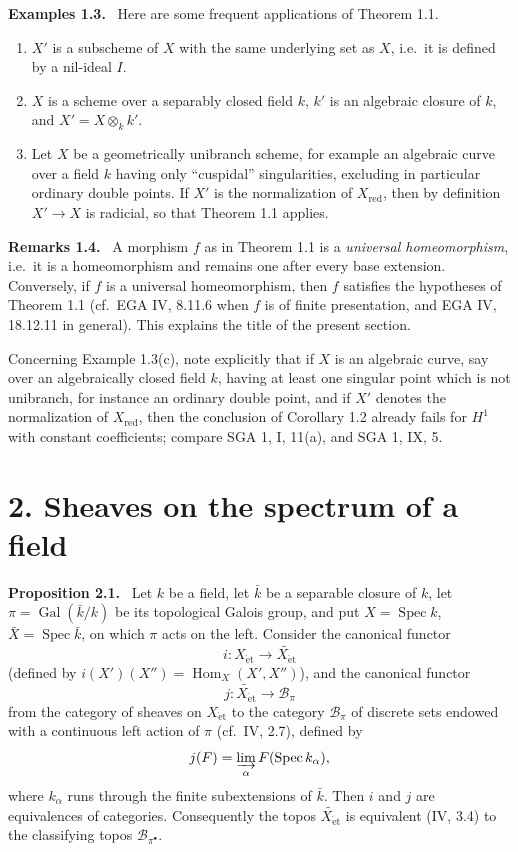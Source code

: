 \documentclass[11pt]{article}
\newcommand{\Bb}{\mathcal{B}}
\newcommand{\Spec}{\operatorname{Spec}}
\newcommand{\Hom}{\operatorname{Hom}}
\newcommand{\Gal}{\operatorname{Gal}}
\newcommand{\red}{\mathrm{red}}
\newcommand{\et}{\mathrm{\acute{e}t}}
\newcommand{\ie}{i.e.\ }
\newcommand{\cf}{cf.\ }
\newcommand{\SGA}{SGA}
\newcommand{\EGA}{EGA}
\newenvironment{statement}[1]{\par\medskip\noindent\textbf{#1.}\ }{\par\medskip}
\newenvironment{remarktext}[1]{\par\medskip\noindent\textbf{#1.}\ }{\par\medskip}
\begin{document}
\begin{remarktext}{Examples 1.3}
Here are some frequent applications of Theorem 1.1.
\begin{enumerate}[label=\alph*)]
\item \(X'\) is a subscheme of \(X\) with the same underlying set as \(X\), \ie it is defined by a nil-ideal \(I\).
\item \(X\) is a scheme over a separably closed field \(k\), \(k'\) is an algebraic closure of \(k\), and \(X'=X\otimes_k k'\).
\item Let \(X\) be a geometrically unibranch scheme, for example an algebraic curve over a field \(k\) having only ``cuspidal'' singularities, excluding in particular ordinary double points. If \(X'\) is the normalization of \(X_{\red}\), then by definition \(X'\to X\) is radicial, so that Theorem 1.1 applies.
\end{enumerate}
\end{remarktext}

\begin{remarktext}{Remarks 1.4}
A morphism \(f\) as in Theorem 1.1 is a \emph{universal homeomorphism}, \ie it is a homeomorphism and remains one after every base extension. Conversely, if \(f\) is a universal homeomorphism, then \(f\) satisfies the hypotheses of Theorem 1.1 (\cf \EGA{} IV, 8.11.6 when \(f\) is of finite presentation, and \EGA{} IV, 18.12.11 in general). This explains the title of the present section.

Concerning Example 1.3(c), note explicitly that if \(X\) is an algebraic curve, say over an algebraically closed field \(k\), having at least one singular point which is not unibranch, for instance an ordinary double point, and if \(X'\) denotes the normalization of \(X_{\red}\), then the conclusion of Corollary 1.2 already fails for \(H^1\) with constant coefficients; compare \SGA{} 1, I, 11(a), and \SGA{} 1, IX, 5.
\end{remarktext}

\section*{2. Sheaves on the spectrum of a field}

\begin{statement}{Proposition 2.1}
Let \(k\) be a field, let \(\bar{k}\) be a separable closure of \(k\), let \(\pi=\Gal(\bar{k}/k)\) be its topological Galois group, and put \(X=\Spec k\), \(\bar X=\Spec\bar k\), on which \(\pi\) acts on the left. Consider the canonical functor
\[
i:X_{\et}\longrightarrow \widetilde{X_{\et}}
\]
(defined by \(i(X')(X'')=\Hom_X(X',X'')\)), and the canonical functor
\[
j:\widetilde{X_{\et}}\longrightarrow \Bb_\pi
\]
from the category of sheaves on \(X_{\et}\) to the category \(\Bb_\pi\) of discrete sets endowed with a continuous left action of \(\pi\) (\cf IV, 2.7), defined by
\[
j(F)=\varinjlim_\alpha F(\Spec k_\alpha),
\]
where \(k_\alpha\) runs through the finite subextensions of \(\bar k\). Then \(i\) and \(j\) are equivalences of categories. Consequently the topos \(\widetilde{X_{\et}}\) is equivalent (IV, 3.4) to the classifying topos \(\Bb_{\pi^{\bullet}}\).
\end{statement}
\end{document}
